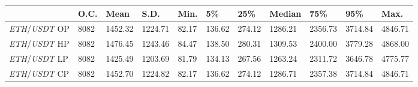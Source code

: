 \begin{tabular}{lllllllllll}
\toprule
 & \textbf{O.C.} & \textbf{Mean} & \textbf{S.D.} & \textbf{Min.} & \textbf{5\%} & \textbf{25\%} & \textbf{Median} & \textbf{75\%} & \textbf{95\%} & \textbf{Max.} \\
\midrule
\emph{ETH}/\emph{USDT} OP & 8082 & 1452.32 & 1224.71 & 82.17 & 136.62 & 274.12 & 1286.21 & 2356.73 & 3714.84 & 4846.71 \\
\emph{ETH}/\emph{USDT} HP & 8082 & 1476.45 & 1243.46 & 84.47 & 138.50 & 280.31 & 1309.53 & 2400.00 & 3779.28 & 4868.00 \\
\emph{ETH}/\emph{USDT} LP & 8082 & 1425.49 & 1203.69 & 81.79 & 134.13 & 267.56 & 1263.24 & 2311.72 & 3646.78 & 4775.77 \\
\emph{ETH}/\emph{USDT} CP & 8082 & 1452.70 & 1224.82 & 82.17 & 136.62 & 274.12 & 1286.71 & 2357.38 & 3714.84 & 4846.71 \\
\bottomrule
\end{tabular}
